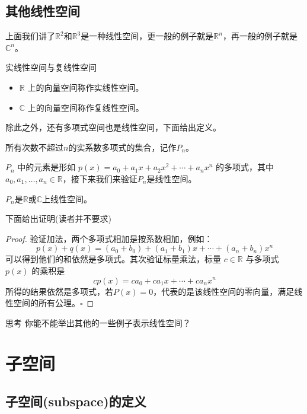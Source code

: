 \subsection{其他线性空间}

上面我们讲了$\mathbb{R}^2$和$\mathbb{R}^3$是一种线性空间，更一般的例子就是$\mathbb{R}^n$，再一般的例子就是$\mathbb{C}^n$。

\begin{definition}{实线性空间与复线性空间}
	\begin{itemize}
		\item $\mathbb{R}$ 上的向量空间称作实线性空间。
		\item $\mathbb{C}$ 上的向量空间称作复线性空间。
	\end{itemize}
\end{definition}

除此之外，还有多项式空间也是线性空间，下面给出定义。

\begin{definition}
	所有次数不超过$n$的实系数多项式的集合，记作$P_n$。
\end{definition}

$P_n$ 中的元素是形如 $p(x) = a_0 + a_1 x + a_2 x^2 + \cdots + a_n x^n$ 的多项式，其中 $a_0, a_1, \dots, a_n \in \mathbb{R}$，接下来我们来验证$P_n$是线性空间。

\begin{corollary}
	$P_n$是$\mathbb{R}$或$\mathbb{C}$上线性空间。
\end{corollary}

下面给出证明(读者并不要求)

\begin{proof}
	验证加法，两个多项式相加是按系数相加，例如：$$p(x) + q(x) = (a_0 + b_0) + (a_1 + b_1)x + \cdots + (a_n + b_n)x^n$$可以得到他们的和依然是多项式。其次验证标量乘法，标量 $c \in \mathbb{R}$ 与多项式 $p(x)$ 的乘积是$$c p(x) = c a_0 + c a_1 x + \cdots + c a_n x^n$$所得的结果依然是多项式，若$P(x)=0$，代表的是该线性空间的零向量，满足线性空间的所有公理。$\square$
\end{proof}

\begin{ascolorbox1}{思考}
	你能不能举出其他的一些例子表示线性空间？
\end{ascolorbox1}

\section{子空间}

\subsection{子空间(subspace)的定义}


